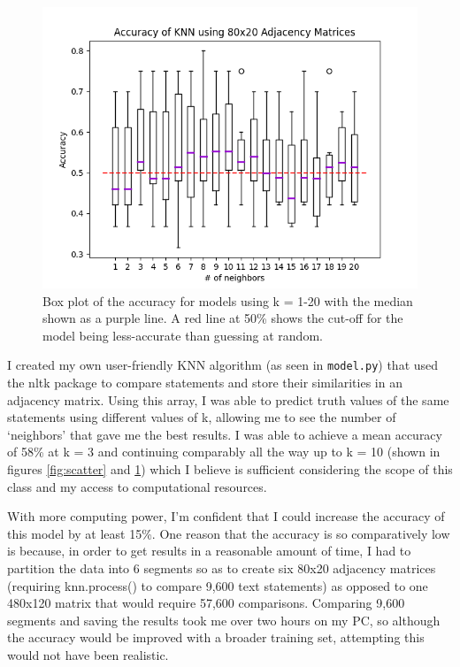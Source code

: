 \documentclass[]{article}
\begin{document}
		\begin{figure}
			\centering
			\includegraphics[width=0.8\linewidth]{accuracies-box.png}
			\caption{Box plot of the accuracy for models using k = 1-20 with the median shown as a purple line. A red line at 50\% shows the cut-off for the model being less-accurate than guessing at random.}
			\label{fig:box}
		\end{figure}
	
		I created my own user-friendly KNN algorithm (as seen in \texttt{model.py}) that used the nltk package to compare statements and store their similarities in an adjacency matrix. Using this array, I was able to predict truth values of the same statements using different values of k, allowing me to see the number of `neighbors' that gave me the best results.
		I was able to achieve a mean accuracy of 58\% at k = 3 and continuing comparably all the way up to k = 10 (shown in figures \ref{fig:scatter} and \ref{fig:box}) which I believe is sufficient considering the scope of this class and my access to computational resources.
		
		
		
		With more computing power, I'm confident that I could increase the accuracy of this model by at least 15\%. One reason that the accuracy is so comparatively low is because, in order to get results in a reasonable amount of time, I had to partition the data into 6 segments so as to create six 80x20 adjacency matrices (requiring knn.process() to compare 9,600 text statements) as opposed to one 480x120 matrix that would require 57,600 comparisons. Comparing 9,600 segments and saving the results took me over two hours on my PC, so although the accuracy would be improved with a broader training set, attempting this would not have been realistic.
		
\end{document}
